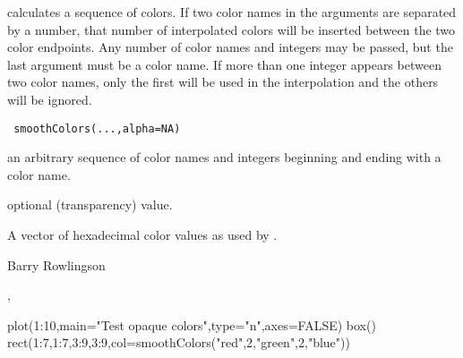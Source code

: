 \begin{Description}\relax
{} calculates a sequence of colors. If two color names 
in the arguments are separated by a number, that number of interpolated
colors will be inserted between the two color endpoints. Any number of
color names and integers may be passed, but the last argument must be
a color name. If more than one integer appears between two color names,
only the first will be used in the interpolation and the others will be
ignored.
\end{Description}
\begin{Usage}
\begin{verbatim}
 smoothColors(...,alpha=NA)
\end{verbatim}
\end{Usage}
\begin{Arguments}
\begin{ldescription}
\item[\code{...}] an arbitrary sequence of color names and integers beginning
and ending with a color name.
\item[\code{alpha}] optional  (transparency) value.
\end{ldescription}
\end{Arguments}
\begin{Value}
A vector of hexadecimal color values as used by .
\end{Value}
\begin{Author}\relax
Barry Rowlingson
\end{Author}
\begin{SeeAlso}\relax
{},
\end{SeeAlso}
\begin{Examples}
\begin{ExampleCode}
 plot(1:10,main="Test opaque colors",type="n",axes=FALSE)
 box()
 rect(1:7,1:7,3:9,3:9,col=smoothColors("red",2,"green",2,"blue"))
\end{ExampleCode}
\end{Examples}

